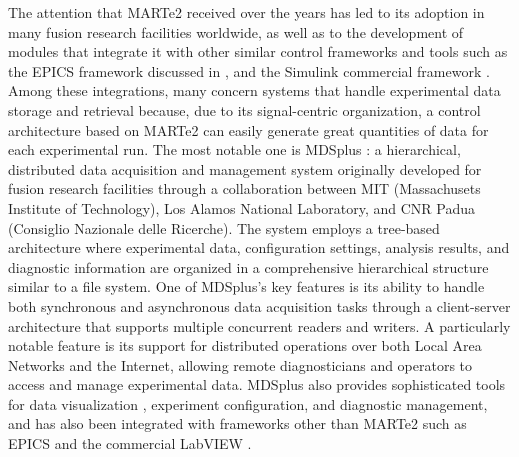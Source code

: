 The attention that MARTe2 received over the years has led to its adoption in many fusion research facilities worldwide, as well as to the development of modules that integrate it with other similar control frameworks and tools such as the EPICS framework discussed in  \cite{barbalace_performance_2011,manduchi_portable_2018}, and the Simulink commercial framework \cite{manduchi_integration_2015}. Among these integrations, many concern systems that handle experimental data storage and retrieval because, due to its signal-centric organization, a control architecture based on MARTe2 can easily generate great quantities of data for each experimental run. The most notable one is MDSplus \cite{stillerman_mdsplus_1997,manduchi_mdsplus_2012,fredian_mdsplus_2008,manduchi_commonalities_2010,fredian_mdsplus_2018}: a hierarchical, distributed data acquisition and management system originally developed for fusion research facilities through a collaboration between MIT (Massachusets Institute of Technology), Los Alamos National Laboratory, and CNR Padua (Consiglio Nazionale delle Ricerche). The system employs a tree-based architecture where experimental data, configuration settings, analysis results, and diagnostic information are organized in a comprehensive hierarchical structure similar to a file system. One of MDSplus's key features is its ability to handle both synchronous and asynchronous data acquisition tasks through a client-server architecture that supports multiple concurrent readers and writers. A particularly notable feature is its support for distributed operations over both Local Area Networks and the Internet, allowing remote diagnosticians and operators to access and manage experimental data. MDSplus also provides sophisticated tools for data visualization \cite{manduchi_java_2000}, experiment configuration, and diagnostic management, and has also been integrated with frameworks other than MARTe2 such as EPICS \cite{manduchi_new_2011} and the commercial LabVIEW \cite{national_instruments_labview_nodate,manduchi_new_2013}.

